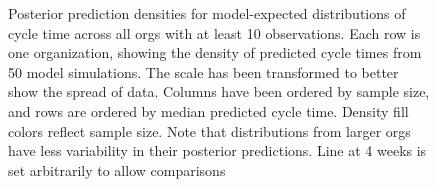 \documentclass[manuscript,screen,review]{acmart}
\begin{document}
\begin{figure}


\caption[Cycle Time Variability Across
Organizations]{\label{fig-pp-check-org}Posterior prediction densities
for model-expected distributions of cycle time across all orgs with at
least 10 observations. Each row is one organization, showing the density
of predicted cycle times from 50 model simulations. The scale has been
transformed to better show the spread of data. Columns have been ordered
by sample size, and rows are ordered by median predicted cycle time.
Density fill colors reflect sample size. Note that distributions from
larger orgs have less variability in their posterior predictions. Line
at 4 weeks is set arbitrarily to allow comparisons}

\end{figure}%
\end{document}
